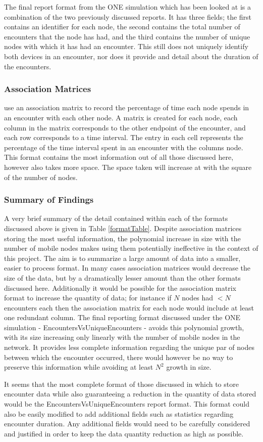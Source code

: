 The final report format from the ONE simulation which has been looked at is a combination of the two previously discussed reports. It has three fields; the first contains an identifier for each node, the second contains the total number of encounters that the node has had, and the third contains the number of unique nodes with which it has had an encounter. This still does not uniquely identify both devices in an encounter, nor does it provide and detail about the duration of the encounters.

\subsubsection{Association Matrices}
\citeauthor{Thakur2012} use an association matrix to record the percentage of time each node spends in an encounter with each other node. A matrix is created for each node, each column in the matrix corresponds to the other endpoint of the encounter, and each row corresponds to a time interval. The entry in each cell represents the percentage of the time interval spent in an encounter with the columns node. This format contains the most information out of all those discussed here, however also takes more space. The space taken will increase at with the square of the number of nodes.



\subsubsection{Summary of Findings}
A very brief summary of the detail contained within each of the formats discussed above is given in Table \ref{formatTable}. Despite association matrices storing the most useful information, the polynomial increase in size with the number of mobile nodes makes using them potentially ineffective in the context of this project. The aim is to summarize a large amount of data into a smaller, easier to process format. In many cases association matrices would decrease the size of the data, but by a dramatically lesser amount than the other formats discussed here. Additionally it would be possible for the association matrix format to increase the quantity of data; for instance if $N$ nodes had $< N$ encounters each then the association matrix for each node would include at least one redundant column. The final reporting format discussed under the ONE simulation - EncountersVsUniqueEncounters - avoids this polynomial growth, with its size increasing only linearly with the number of mobile nodes in the network. It provides less complete information regarding the unique par of nodes between which the encounter occurred, there would however be no way to preserve this information while avoiding at least $N^{2}$ growth in size.

It seems that the most complete format of those discussed in which to store encounter data while also guaranteeing a reduction in the quantity of data stored would be the EncountersVsUniqueEncounters report format. This format could also be easily modified to add additional fields such as statistics regarding encounter duration. Any additional fields would need to be carefully considered and justified in order to keep the data quantity reduction as high as possible.